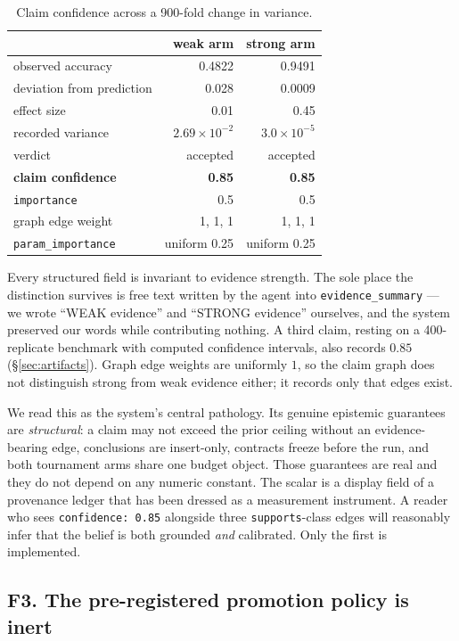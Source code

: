 \documentclass[10pt,twocolumn,letterpaper]{article}
\newcommand{\code}[1]{\texttt{#1}}
\begin{document}
\begin{table}[t]
\centering
\caption{Claim confidence across a 900-fold change in variance.}
\label{tab:invariance}
\small
\begin{tabular}{lrr}
\toprule
 & \textbf{weak arm} & \textbf{strong arm} \\
\midrule
observed accuracy & 0.4822 & 0.9491 \\
deviation from prediction & 0.028 & 0.0009 \\
effect size & 0.01 & 0.45 \\
recorded variance & $2.69\times10^{-2}$ & $3.0\times10^{-5}$ \\
verdict & accepted & accepted \\
\textbf{claim confidence} & \textbf{0.85} & \textbf{0.85} \\
\code{importance} & 0.5 & 0.5 \\
graph edge weight & 1, 1, 1 & 1, 1, 1 \\
\code{param\_importance} & uniform 0.25 & uniform 0.25 \\
\bottomrule
\end{tabular}
\end{table}

Every structured field is invariant to evidence strength. The sole place the distinction survives
is free text written by the agent into \code{evidence\_summary} --- we wrote ``WEAK evidence'' and
``STRONG evidence'' ourselves, and the system preserved our words while contributing nothing.
A third claim, resting on a 400-replicate benchmark with computed confidence intervals, also
records $0.85$ (\S\ref{sec:artifacts}). Graph edge weights are uniformly $1$, so the claim graph
does not distinguish strong from weak evidence either; it records only that edges exist.

We read this as the system's central pathology. Its genuine epistemic guarantees are
\emph{structural}: a claim may not exceed the prior ceiling without an evidence-bearing edge,
conclusions are insert-only, contracts freeze before the run, and both tournament arms share one
budget object. Those guarantees are real and they do not depend on any numeric constant. The
scalar is a display field of a provenance ledger that has been dressed as a measurement instrument.
A reader who sees \code{confidence: 0.85} alongside three \code{supports}-class edges will
reasonably infer that the belief is both grounded \emph{and} calibrated. Only the first is implemented.

\subsection{F3. The pre-registered promotion policy is inert}
\label{sec:f3}
\end{document}
